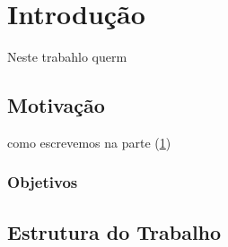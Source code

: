 

\chapter{Introdução}
\label{cap:intro} %

Neste trabahlo querm


\lipsum[1]

\section{Motivação}
\label{sec:motivacao}
como escrevemos na parte (\ref{cap:intro})
\lipsum[2-4]

\subsection{Objetivos}
\label{sec:objetivos}

\lipsum[2-5]

\section{Estrutura do Trabalho}
\label{sec:estrutura}

\lipsum[1]